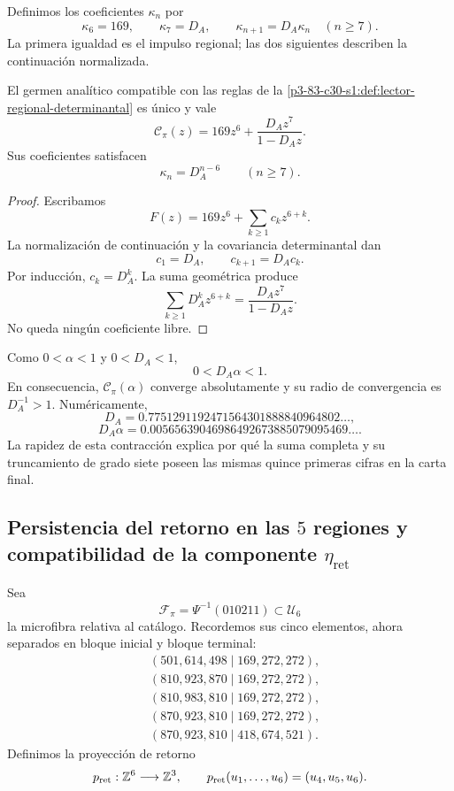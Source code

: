 
Definimos los coeficientes \(\kappa_n\) por
\[
\kappa_6=169,
\qquad
\kappa_7=D_A,
\qquad
\kappa_{n+1}=D_A\kappa_n\quad(n\ge7).
\]
La primera igualdad es el impulso regional; las dos siguientes describen la
continuación normalizada.

\begin{theorem}
\label{p3-83-c30-s1:thm:realizacion-analitica-graduada}
El germen analítico compatible con las reglas de la
\cref{p3-83-c30-s1:def:lector-regional-determinantal} es único y vale
\[
\boxed{
\mathscr C_\pi(z)
=169z^6+\frac{D_Az^7}{1-D_Az}.}
\]
Sus coeficientes satisfacen
\[
\kappa_n=D_A^{n-6}\qquad(n\ge7).
\]
\end{theorem}

\begin{proof}
Escribamos
\[
F(z)=169z^6+\sum_{k\ge1}c_kz^{6+k}.
\]
La normalización de continuación y la covariancia determinantal dan
\[
c_1=D_A,
\qquad
c_{k+1}=D_Ac_k.
\]
Por inducción, \(c_k=D_A^k\). La suma geométrica produce
\[
\sum_{k\ge1}D_A^kz^{6+k}
=\frac{D_Az^7}{1-D_Az}.
\]
No queda ningún coeficiente libre.
\end{proof}

Como \(0<\alpha<1\) y \(0<D_A<1\),
\[
0<D_A\alpha<1.
\]
En consecuencia, \(\mathscr C_\pi(\alpha)\) converge absolutamente y su
radio de convergencia es \(D_A^{-1}>1\). Numéricamente,
\[
D_A=0.7751291192471564301888840964802\ldots,
\]
\[
D_A\alpha=0.00565639046986492673885079095469\ldots.
\]
La rapidez de esta contracción explica por qué la suma completa y su
truncamiento de grado siete poseen las mismas quince primeras cifras en la
carta final.

\subsection{Persistencia del retorno en las \texorpdfstring{\(5\)}{5} regiones y compatibilidad de la componente \texorpdfstring{\(\eta_{\mathrm{ret}}\)}{eta_ret}}
\label{sec:s102:c38:2:5}


Sea
\[
\mathcal F_\pi=\Psi^{-1}(010211)\subset\mathcal U_6
\]
la microfibra relativa al catálogo. Recordemos sus cinco elementos, ahora
separados en bloque inicial y bloque terminal:
\[
\begin{aligned}
 &(501,614,498\mid169,272,272),\\
 &(810,923,870\mid169,272,272),\\
 &(810,983,810\mid169,272,272),\\
 &(870,923,810\mid169,272,272),\\
 &(870,923,810\mid418,674,521).
\end{aligned}
\]
Definimos la proyección de retorno
\[
p_{\rm ret}:\mathbb Z^6\longrightarrow\mathbb Z^3,
\qquad
p_{\rm ret}(u_1,\ldots,u_6)=(u_4,u_5,u_6).
\]

